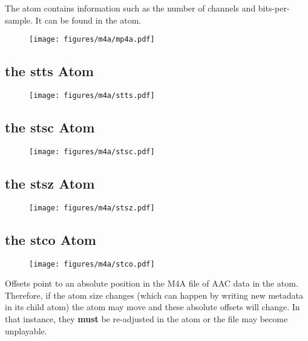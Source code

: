 The  atom contains information such as the number of channels
and bits-per-sample.  It can be found in the  atom.

\begin{figure}[h]
\texttt{[image: figures/m4a/mp4a.pdf]}
\end{figure}

\clearpage

\subsection{the stts Atom}

\begin{figure}[h]
\texttt{[image: figures/m4a/stts.pdf]}
\end{figure}

\subsection{the stsc Atom}

\begin{figure}[h]
\texttt{[image: figures/m4a/stsc.pdf]}
\end{figure}

\clearpage

\subsection{the stsz Atom}

\begin{figure}[h]
\texttt{[image: figures/m4a/stsz.pdf]}
\end{figure}

\subsection{the stco Atom}

\begin{figure}[h]
\texttt{[image: figures/m4a/stco.pdf]}
\end{figure}
\par
\noindent
Offsets point to an absolute position in the M4A file of AAC data in
the  atom.  Therefore, if the  atom size changes
(which can happen by writing new metadata in its  child atom)
the  atom may move and these absolute offsets will change.
In that instance, they \textbf{must}
be re-adjusted in the  atom or the file may become unplayable.

\clearpage

